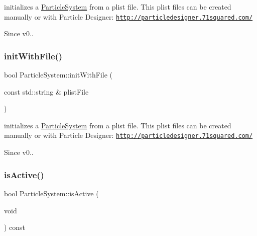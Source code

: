 initializes a \hyperlink{classParticleSystem}{Particle\+System} from a plist file. This plist files can be created manually or with Particle Designer\+: \href{http://particledesigner.71squared.com/}{\tt http\+://particledesigner.\+71squared.\+com/} \begin{DoxySince}{Since}
v0.. 
\end{DoxySince}
\mbox{\label{classParticleSystem_ae7ac29438534c33f71f36502b75a2c62}} 
\subsubsection{\texorpdfstring{init\+With\+File()}{initWithFile()}\hspace{0.1cm}{\footnotesize\ttfamily [2/2]}}
{\footnotesize\ttfamily bool Particle\+System\+::init\+With\+File (\begin{DoxyParamCaption}\item[{const std\+::string \&}]{plist\+File }\end{DoxyParamCaption})}

initializes a \hyperlink{classParticleSystem}{Particle\+System} from a plist file. This plist files can be created manually or with Particle Designer\+: \href{http://particledesigner.71squared.com/}{\tt http\+://particledesigner.\+71squared.\+com/} \begin{DoxySince}{Since}
v0.. 
\end{DoxySince}
\mbox{\label{classParticleSystem_a2304b930424d5a65d96b1c1b3bf22873}} 
\subsubsection{\texorpdfstring{is\+Active()}{isActive()}\hspace{0.1cm}{\footnotesize\ttfamily [1/2]}}
{\footnotesize\ttfamily bool Particle\+System\+::is\+Active (\begin{DoxyParamCaption}\item[{void}]{ }\end{DoxyParamCaption}) const\hspace{0.3cm}{\ttfamily [virtual]}}

